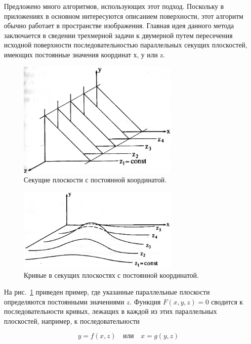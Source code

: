 Предложено много алгоритмов, использующих этот подход. Поскольку в приложениях в основном интересуются описанием поверхности, этот алгоритм обычно работает в пространстве изображения. Главная идея данного метода заключается в сведении трехмерной задачи к двумерной путем пересечения исходной поверхности последовательностью параллельных секущих плоскостей, имеющих постоянные значения координат х, у или z.

\begin{figure}[H]
    \centering
    \includegraphics[width=0.7\textwidth]{img/floating_horizon_1.png}
    \caption{Секущие плоскости с постоянной координатой.}
    \label{fig:floating_horizon_1}
\end{figure}

\begin{figure}[H]
    \centering
    \includegraphics[width=0.7\textwidth]{img/floating_horizon_2.png}
    \caption{Кривые в секущих плоскостях с постоянной координатой.}
    \label{fig:floating_horizon_2}
\end{figure}

На рис.~\ref{fig:floating_horizon_1} приведен пример, где указанные параллельные плоскости определяются постоянными значениями \( z \). Функция \( F(x, y, z) = 0 \) сводится к последовательности кривых, лежащих в каждой из этих параллельных плоскостей, например, к последовательности

\begin{equation}
y = f(x, z) \quad \text{или} \quad x = g(y, z)
\end{equation}

